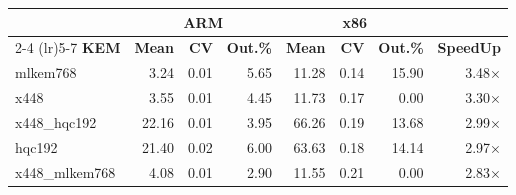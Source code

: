 \begin{table}[!ht]
\begin{tabular}{lrrr|rrr|r}
 \toprule
& \multicolumn{3}{c}{\bfseries ARM} & \multicolumn{3}{c}{\bfseries x86} &\\
\cmidrule(lr){2-4} \cmidrule(lr){5-7}
\textbf{KEM} & \textbf{Mean} & \textbf{CV} & \textbf{Out.\%} & \textbf{Mean} & \textbf{CV} & \textbf{Out.\%} & \textbf{SpeedUp}\\
\midrule
mlkem768 & 3.24 & 0.01 & 5.65 & 11.28 & 0.14 & 15.90 & 3.48× \\
x448 & 3.55 & 0.01 & 4.45 & 11.73 & 0.17 & 0.00 & 3.30× \\
x448_hqc192 & 22.16 & 0.01 & 3.95 & 66.26 & 0.19 & 13.68 & 2.99× \\
hqc192 & 21.40 & 0.02 & 6.00 & 63.63 & 0.18 & 14.14 & 2.97× \\
x448_mlkem768 & 4.08 & 0.01 & 2.90 & 11.55 & 0.21 & 0.00 & 2.83× \\
\bottomrule
\end{tabular}
\end{table}
